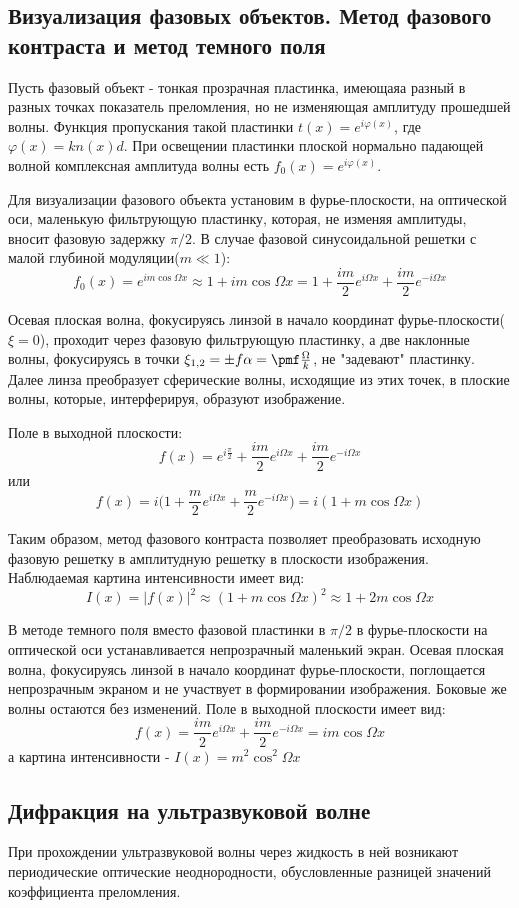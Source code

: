 \documentclass[a4paper,12pt]{article}
\begin{document}
\subsection{Визуализация фазовых объектов. Метод фазового контраста и метод темного поля}
Пусть фазовый объект - тонкая прозрачная пластинка, имеющаяа разный в разных точках показатель преломления, но не изменяющая амплитуду прошедшей волны. Функция пропускания такой пластинки $t(x)=e^{i\varphi(x)}$, где $\varphi(x)=kn(x)d$. При освещении пластинки плоской нормально падающей волной комплексная амплитуда волны есть $f_0(x)=e^{i\varphi(x)}$. 

Для визуализации фазового объекта установим в фурье-плоскости, на оптической оси, маленькую фильтрующую пластинку, которая, не изменяя амплитуды, вносит фазовую задержку $\pi/2$. В случае фазовой синусоидальной решетки с малой глубиной модуляции($m\ll 1$):
$$
f_0(x)=e^{im\cos{\Omega x}} \approx 1+im\cos{\Omega x} = 1 + \frac{im}{2}e^{i\Omega x} + \frac{im}{2}e^{-i\Omega x}
$$

Осевая плоская волна, фокусируясь линзой в начало координат фурье-плоскости($\xi=0$), проходит через фазовую фильтрующую пластинку, а две наклонные волны, фокусируясь в точки $\xi_{1,2}=\pm f\alpha =\pmf\frac{\Omega}{k}$, не "задевают" пластинку. Далее линза преобразует сферические волны, исходящие из этих точек, в плоские волны, которые, интерферируя, образуют изображение.

Поле в выходной плоскости:
$$
f(x)=e^{i\frac{\pi}{2}}+\frac{im}{2}e^{i\Omega x} + \frac{im}{2}e^{-i\Omega x}
$$
или
$$
f(x)=i\Big(1+\frac{m}{2}e^{i\Omega x} + \frac{m}{2}e^{-i\Omega x} \Big) = i(1 + m\cos{\Omega x})
$$

Таким образом, метод фазового контраста позволяет преобразовать исходную фазовую решетку в амплитудную решетку в плоскости изображения. Наблюдаемая картина интенсивности имеет вид:
$$
I(x)=|f(x)|^2 \approx (1+m\cos{\Omega x})^2 \approx 1 + 2m\cos{\Omega x}
$$

В методе темного поля вместо фазовой пластинки в $\pi/2$ в фурье-плоскости на оптической оси устанавливается непрозрачный маленький экран. Осевая плоская волна, фокусируясь линзой в начало  координат фурье-плоскости, поглощается непрозрачным экраном и не участвует в формировании изображения. Боковые же волны остаются без изменений. Поле в выходной плоскости имеет вид:
$$
f(x)=\frac{im}{2}e^{i\Omega x}+\frac{im}{2}e^{-i\Omega x}=im\cos{\Omega x}
$$
а картина интенсивности - $I(x)=m^2\cos^2{\Omega x}$

\subsection{Дифракция на ультразвуковой волне}
При прохождении ультразвуковой волны через жидкость в ней возникают периодические оптические неоднородности, обусловленные разницей значений коэффициента преломления.
\end{document}
